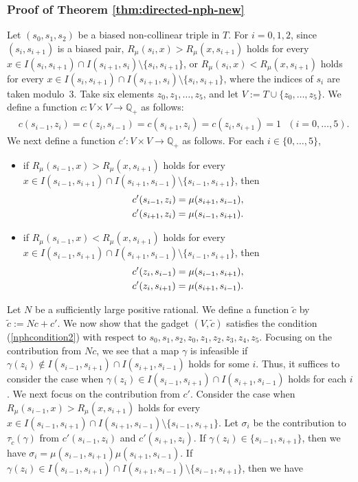 \documentclass[11pt]{article}
\theoremstyle{definition}
\begin{document}
\subsubsection{Proof of Theorem \ref{thm:directed-nph-new}}
Let $(s_0,s_1,s_2)$ be a biased non-collinear triple in $T$. For $i=0,1,2$, since $(s_i,s_{i+1})$ is a biased pair, $R_{\mu}(s_i,x)>R_{\mu}(x,s_{i+1})$ holds for every $x\in I(s_i,s_{i+1})\cap I(s_{i+1},s_i)\setminus \{s_i,s_{i+1}\}$, or $R_{\mu}(s_i,x)<R_{\mu}(x,s_{i+1})$ holds for every $x\in I(s_i,s_{i+1})\cap I(s_{i+1},s_i)\setminus \{s_i,s_{i+1}\}$, where the indices of $s_i$ are taken modulo~3. 
Take six elements $z_0,z_1,\ldots,z_5$, and let $V:=T\cup \{z_0,\ldots,z_5\}$. We define a function $c:V\times V\rightarrow \mathbb{Q}_+$ as follows:
\begin{align}
    &c(s_{i-1},z_i)=c(z_i,s_{i-1})=c(s_{i+1},z_i)=c(z_i,s_{i+1})=1\mathrm{\ \ \ }(i=0,\ldots,5).
\end{align}
We next define a function $c':V\times V\rightarrow \mathbb{Q}_+$ as follows. For each $i\in \{0,\ldots,5\}$,
\begin{itemize}
  \item if $R_{\mu}(s_{i-1},x)>R_{\mu}(x,s_{i+1})$ holds for every $x\in I(s_{i-1},s_{i+1})\cap I(s_{i+1},s_{i-1})\setminus \{s_{i-1},s_{i+1}\}$, then 
\begin{align}
    &c'(s_{i-1},z_i)=\mu(s_{i+1},s_{i-1}),\notag\\
    &c'(s_{i+1},z_i)=\mu(s_{i-1},s_{i+1}).
\end{align}
 \item if $R_{\mu}(s_{i-1},x)<R_{\mu}(x,s_{i+1})$ holds for every $x\in I(s_{i-1},s_{i+1})\cap I(s_{i+1},s_{i-1})\setminus \{s_{i-1},s_{i+1}\}$, then 
\begin{align}
    &c'(z_i,s_{i-1})=\mu(s_{i-1},s_{i+1}),\notag\\
    &c'(z_i,s_{i+1})=\mu(s_{i+1},s_{i-1}).
\end{align}
\end{itemize}
Let $N$ be a sufficiently large positive rational. We define a function $\tilde{c}$ by $\tilde{c}:=Nc+c'$. We now show that the gadget $(V,\tilde{c})$ satisfies the condition (\ref{nphcondition2}) with respect to $s_0,s_1,s_2,z_0,z_1,z_2,z_3,z_4,z_5$. Focusing on the contribution from $Nc$, we see that a map $\gamma$ is infeasible if $\gamma(z_i)\notin I(s_{i-1},s_{i+1})\cap I(s_{i+1},s_{i-1})$ holds for some $i$. Thus, it suffices to consider the case when $\gamma(z_i)\in I(s_{i-1},s_{i+1})\cap I(s_{i+1},s_{i-1})$ holds for each $i$. We next focus on the contribution from $c'$. Consider the case when $R_{\mu}(s_{i-1},x)>R_{\mu}(x,s_{i+1})$ holds for every $x\in I(s_{i-1},s_{i+1})\cap I(s_{i+1},s_{i-1})\setminus \{s_{i-1},s_{i+1}\}$. Let $\sigma_i$ be the contribution to $\tau_{\tilde{c}}(\gamma)$ from $c'(s_{i-1},z_i)$ and $c'(s_{i+1},z_i)$. If $\gamma(z_i)\in \{s_{i-1},s_{i+1}\}$, then we have $\sigma_i=\mu(s_{i-1},s_{i+1})\mu(s_{i+1},s_{i-1})$. If $\gamma(z_i)\in I(s_{i-1},s_{i+1})\cap I(s_{i+1},s_{i-1})\setminus \{s_{i-1},s_{i+1}\}$, then we have
\end{document}
